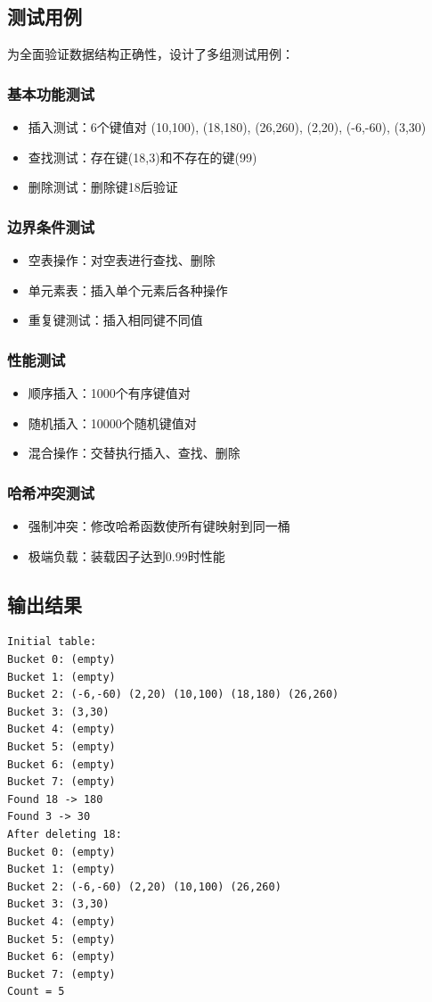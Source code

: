 \documentclass[12pt,a4paper]{article}
\begin{document}
\subsection{测试用例}
为全面验证数据结构正确性，设计了多组测试用例：

\subsubsection{基本功能测试}
\begin{itemize}
\item 插入测试：6个键值对 (10,100), (18,180), (26,260), (2,20), (-6,-60), (3,30)
\item 查找测试：存在键(18,3)和不存在的键(99)
\item 删除测试：删除键18后验证
\end{itemize}

\subsubsection{边界条件测试}
\begin{itemize}
\item 空表操作：对空表进行查找、删除
\item 单元素表：插入单个元素后各种操作
\item 重复键测试：插入相同键不同值
\end{itemize}

\subsubsection{性能测试}
\begin{itemize}
\item 顺序插入：1000个有序键值对
\item 随机插入：10000个随机键值对
\item 混合操作：交替执行插入、查找、删除
\end{itemize}

\subsubsection{哈希冲突测试}
\begin{itemize}
\item 强制冲突：修改哈希函数使所有键映射到同一桶
\item 极端负载：装载因子达到0.99时性能
\end{itemize}

\subsection{输出结果}
\begin{verbatim}
Initial table:
Bucket 0: (empty)
Bucket 1: (empty)
Bucket 2: (-6,-60) (2,20) (10,100) (18,180) (26,260) 
Bucket 3: (3,30) 
Bucket 4: (empty)
Bucket 5: (empty)
Bucket 6: (empty)
Bucket 7: (empty)
Found 18 -> 180
Found 3 -> 30
After deleting 18:
Bucket 0: (empty)
Bucket 1: (empty)
Bucket 2: (-6,-60) (2,20) (10,100) (26,260) 
Bucket 3: (3,30) 
Bucket 4: (empty)
Bucket 5: (empty)
Bucket 6: (empty)
Bucket 7: (empty)
Count = 5
\end{verbatim}
\end{document}
